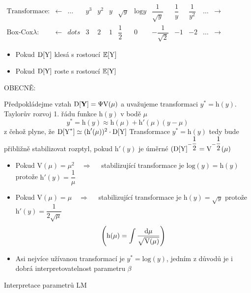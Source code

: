 

\begin{table}[h]
\centering
$\begin{array}{ *{13}{c} }
\text{Transformace:} & \leftarrow & \dots &  y^3 &  y^2 &  y & \sqrt{y}  & \text{log}y & \dfrac{1}{\sqrt{y}}  & \dfrac{1}{y} & \dfrac{1}{y^2} & \dots  & \rightarrow \\
\text{Box-Cox} \lambda : &\leftarrow  & dots & 3 & 2 & 1 & \dfrac{1}{2}  & 0 &  -\dfrac{1}{\sqrt{2}} & -1 & -2 & \dots & \rightarrow
\end{array}$
\end{table}

\begin{itemize}
\item Pokud $ \mathrm{D}[\text{Y}] $ klesá s rostoucí $ \mathbb{E}[\text{Y}] $
\item Pokud $ \mathrm{D}[\text{Y}] $ roste s rostoucí $ \mathbb{E}[\text{Y}] $
\end{itemize}

OBECNĚ:

Předpokládejme vztah $ \mathrm{D}[\textbf{Y}] = \Psi \text{V}(\mu) $ a uvažujeme transformaci $ y^* = \text{h}(y) $. Taylorův rozvoj 1. řádu funkce $ \text{h}(y) $ v bodě $ \mu $
$$  
 y^* = \text{h}(y) \approx \text{h}(\mu) + \text{h}'(\mu)(y-\mu)
$$
z čehož plyne, že $ \mathrm{D}[\text{Y}^*] \simeq ( \text{h}'(\mu) )^2 \cdot \mathrm{D}[\text{Y}] $
Transformace $  y^* = \text{h}(y) $ tedy bude přibližně stabilizovat rozptyl, pokud $ \text{h}'(y) $ je úměrné $ (\mathrm{D}[\text{Y}]^{-\dfrac{1}{2}} = \text{V}^{-\dfrac{1}{2}}(\mu) $

\begin{itemize}
\item Pokud $ \text{V}(\mu) = \mu^2 \quad \Rightarrow \quad $ stabilizující transformace je $ \text{log}(y) = \text{h}(y) $ protože $ \text{h}'(y) = \dfrac{1}{\mu} $
\item Pokud $ \text{V}(\mu) = \mu \quad \Rightarrow \quad $ stabilizující transformace je $ \text{h}(y) = \sqrt{y} $ protože $ \text{h}'(y) = \dfrac{1}{2 \sqrt{\mu}} $
$$  
 \left( \text{h}(\mu) =  \int \frac{\mathrm{d} \mu}{\sqrt{\text{V}(\mu)}} \right)
$$
\item Asi nejvíce užívanou transformací je $ y^* = \text{log}(y) $, jedním z důvodů je i dobrá interpretovatelnost parametru $ \beta $
\end{itemize}

Interpretace parametrů LM

